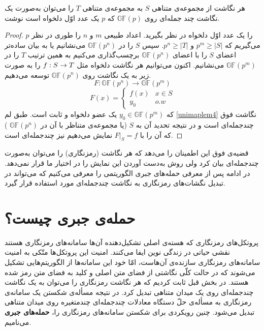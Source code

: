 \begin{theorem}
\label{unimap th}
هر نگاشت از مجموعه‌ی متناهی 
$S$
به مجموعه‌ی متناهی 
$T$
را می‌توان به‌صورت یک نگاشت چند جمله‌ای روی 
$\mathbb{GF}(p)$
که 
$p$
یک عدد اوّل دلخواه است نوشت.

\begin{proof}
$p$
را یک عدد اوّل دلخواه در نظر بگیرید. اعداد طبیعی 
$m$
و
$n$
را طوری در نظر می‌گیریم که 
$p^{m}\geq |S|$
و
$p^{n}\geq|T|$.
سپس 
$S$
را در 
$\mathbb{GF}(p^{n})$
می‌نشانیم یا به بیان ساده‌تر اعضای 
$S$
را با اعضای 
$\mathbb{GF}(p^{n})$
برچسب‌گذاری می‌کنیم به همین ترتیب 
$T$
را در 
$\mathbb{GF}(p^{m})$
می‌نشانیم. اکنون می‌توانیم هر نگاشت دلخواه مثل 
$f:S\rightarrow T$
را به صورت زیر به یک نگاشت روی 
$\mathbb{GF}(p^{n})$
توسعه می‌دهیم.
	$$F:\mathbb{GF}(p^n)\rightarrow \mathbb{GF}(p^m)$$
	$$F(x) = \left \{ \begin{array}{ll}
	f(x) & x\in S\\
	y_0 & o.w
	\end{array} \right.
	$$
	که 
	$y_{0}\in\mathbb{GF}(p^{m})$
	یک عضو دلخواه و ثابت است. طبق لم 
	\ref{unimaplem4}
	نگاشت فوق چندجمله‌ای است و در نتیجه تحدید آن به 
	$S$
	(یا مجموعه‌ی متناظر با آن در 
	$\mathbb{GF}(p^{n})$
	)
که آن را با 
$F|_{S} = f$
نمایش می‌دهیم نیز چندجمله‌ای است.
\end{proof}
\end{theorem}

قضیه‌ی فوق این اطمینان را می‌دهد که هر نگاشت (رمزنگاری) را می‌توان به‌صورت چندجمله‌ای بیان کرد ولی روش به‌دست آوردن این نمایش را در اختیار ما قرار نمی‌دهد. در ادامه پس از معرفی حمله‌های جبری الگوریتمی را معرفی می‌کنیم که می‌تواند در تبدیل  نگشات‌های رمزنگاری به نگاشت چندجمله‌ای مورد استفاده قرار گیرد. 
\section{حمله‌ی جبری چیست؟}
پروتکل‌های رمزنگاری که هسته‌ی اصلی تشکیل‌دهنده‌  آن‌ها سامانه‌های رمزنگاری هستند نقشی حیاتی در زندگی نوین ایفا می‌کنند. امنیت این پروتکل‌ها متّکی به امنیت  سامانه‌های رمزنگاری سازنده‌ی آن‌هاست، امّا خود این سامانه‌ها از الگوریتم‌هایی تشکیل می‌شوند که در حالت کلّی نگاشتی از فضای متن اصلی و کلید به فضای متن رمز شده هستند. در بخش قبل ثابت کردیم که هر نگاشت رمزنگاری را می‌توان به یک نگاشت چندجمله‌ای روی یک میدان متناهی تبدیل کرد. در نتیجه مسأله‌ی شکستن یک سامانه‌ی رمزنگاری به مسأله‌ی حلّ دستگاه معادلات چندجمله‌ای چندمتغیره روی میدان متناهی تبدیل می‌شود. چنین رویکردی برای شکستن سامانه‌های رمزنگاری را،
\textbf{حمله‌های جبری} 
می‌نامیم. 


